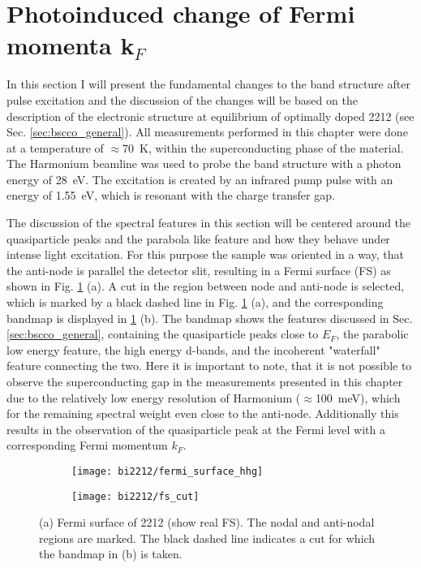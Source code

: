 \section{Photoinduced change of Fermi momenta k$_F$}
\label{sec:larger_effect}

In this section I will present the fundamental changes to the band structure after pulse excitation and the discussion of the changes will be based on the description of the electronic structure at equilibrium of optimally doped 2212 (see Sec. \ref{sec:bscco_general}).
All measurements performed in this chapter were done at a temperature of $\approx$\qty{70}{\kelvin}, within the superconducting phase of the material.
The Harmonium beamline \cite{arrell_harmonium_2017} was used to probe the band structure with a photon energy of \qty{28}{\electronvolt}.
The excitation is created by an infrared pump pulse with an energy of \qty{1.55}{\electronvolt}, which is resonant with the charge transfer gap.

The discussion of the spectral features in this section will be centered around the quasiparticle peaks and the parabola like feature and how they behave under intense light excitation.
For this purpose the sample was oriented in a way, that the anti-node is parallel the detector slit, resulting in a Fermi surface (FS) as shown in Fig. \ref{fig:fs_cut} (a).
A cut in the region between node and anti-node is selected, which is marked by a black dashed line in Fig. \ref{fig:fs_cut} (a), and the corresponding bandmap is displayed in \ref{fig:fs_cut} (b).
The bandmap shows the features discussed in Sec. \ref{sec:bscco_general}, containing the quasiparticle peaks close to $E_F$, the parabolic low energy feature, the high energy  d-bands, and the incoherent "waterfall" feature connecting the two.
Here it is important to note, that it is not possible to observe the superconducting gap in the measurements presented in this chapter due to the relatively low energy resolution of Harmonium ($\approx$\qty{100}{\milli\electronvolt}), which for the remaining spectral weight even close to the anti-node.
Additionally this results in the observation of the quasiparticle peak at the Fermi level with a corresponding Fermi momentum $k_F$.

\begin{figure}[t]
	\centering
	\begin{subfigure}[b]{0.49\textwidth}
		\texttt{[image: bi2212/fermi\_surface\_hhg]}
		\caption{}
	\end{subfigure}
	\begin{subfigure}[b]{0.45\textwidth}
		\texttt{[image: bi2212/fs\_cut]}
		\caption{}
	\end{subfigure}
	\caption{(a) Fermi surface of 2212 (show real FS). The nodal and anti-nodal regions are marked. The black dashed line indicates a cut for which the bandmap in (b) is taken.}
	\label{fig:fs_cut}
\end{figure}

